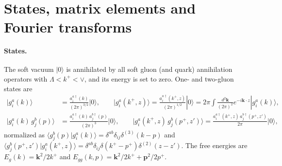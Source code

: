 \section{States, matrix elements and Fourier transforms}\label{app:conv}

\paragraph*{States.} The soft vacuum $|0\rangle$ is annihilated by all soft gluon (and quark) annihilation operators with $\Lambda<k^+<\vee$, and its energy is set to zero. One- and two-gluon states are
\begin{align}
|g^a_i(k)\rangle&=\frac{a^{a\dagger}_i(k)}{(2\pi)^{3/2}}|0\rangle,\qquad |g^a_i(k^+,z)\rangle=\frac{a^{a\dagger}_i(k^+,z)}{(2\pi)^{1/2}}|0\rangle=2\pi\int\frac{d^2\mathbf k}{(2\pi)^2}e^{-i\mathbf k\cdot z}|g^a_i(k)\rangle,\\
|g^a_i(k)\,g^b_j(p)\rangle&=\frac{a^{a\dagger}_i(k)\,a^{b\dagger}_j(p)}{(2\pi)^3}|0\rangle,\qquad |g^a_i(k^+,z)\,g^b_j(p^+,z')\rangle=\frac{a^{a\dagger}_i(k^+,z)\,a^{b\dagger}_j(p^+,z')}{2\pi}|0\rangle,
\end{align}
normalized as $\langle g^b_j(p)|g^a_i(k)\rangle=\delta^{ab}\delta_{ij}\delta^{(3)}(k-p)$ and $\langle g^b_j(p^+,z')|g^a_i(k^+,z)\rangle=\delta^{ab}\delta_{ij}\delta(k^+-p^+)\delta^{(2)}(z-z')$. The free energies are $E_g(k)=\mathbf k^2/2k^+$ and $E_{gg}(k,p)=\mathbf k^2/2k^++\mathbf p^2/2p^+$.

